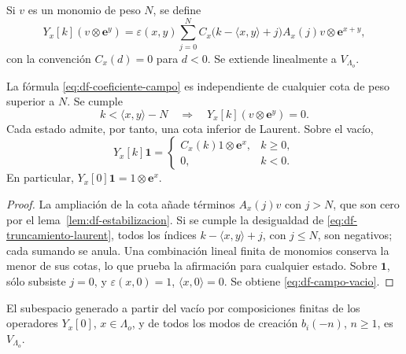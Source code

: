 \begin{definition}
Si \(v\) es un monomio de peso \(N\), se define
\begin{equation}
 Y_x[k](v\otimes\mathbf e^y)
 =\varepsilon(x,y)
 \sum_{j=0}^{N}
 C_x\bigl(k-\langle x,y\rangle+j\bigr)A_x(j)v
       \otimes\mathbf e^{x+y},
 \label{eq:df-coeficiente-campo}
\end{equation}
con la convención \(C_x(d)=0\) para \(d<0\). Se extiende linealmente
a \(V_{\Lambda_o}\).
\end{definition}

\begin{theorem}
\label{thm:df-campo-truncamiento}
La fórmula \eqref{eq:df-coeficiente-campo} es independiente de cualquier
cota de peso superior a \(N\). Se cumple
\begin{equation}
 k<\langle x,y\rangle-N
 \quad\Longrightarrow\quad
 Y_x[k](v\otimes\mathbf e^y)=0.
 \label{eq:df-truncamiento-laurent}
\end{equation}
Cada estado admite, por tanto, una cota inferior de Laurent. Sobre el
vacío,
\begin{equation}
 Y_x[k]\mathbf1=
 \begin{cases}
 C_x(k)1\otimes\mathbf e^x,&k\geq0,\\
 0,&k<0.
 \end{cases}
 \label{eq:df-campo-vacio}
\end{equation}
En particular, \(Y_x[0]\mathbf1=1\otimes\mathbf e^x\).
\end{theorem}

\begin{proof}
La ampliación de la cota añade términos \(A_x(j)v\) con \(j>N\), que
son cero por el lema~\ref{lem:df-estabilizacion}. Si se cumple la
desigualdad de \eqref{eq:df-truncamiento-laurent}, todos los índices
\(k-\langle x,y\rangle+j\), con \(j\leq N\), son negativos; cada
sumando se anula. Una combinación lineal finita de monomios conserva
la menor de sus cotas, lo que prueba la afirmación para cualquier
estado. Sobre \(\mathbf1\), sólo subsiste \(j=0\), y
\(\varepsilon(x,0)=1\), \(\langle x,0\rangle=0\). Se obtiene
\eqref{eq:df-campo-vacio}.
\end{proof}

\begin{theorem}
\label{thm:df-generacion-campos}
El subespacio generado a partir del vacío por composiciones finitas de
los operadores \(Y_x[0]\), \(x\in\Lambda_o\), y de todos los modos
de creación \(b_i(-n)\), \(n\geq1\), es \(V_{\Lambda_o}\).
\end{theorem}

